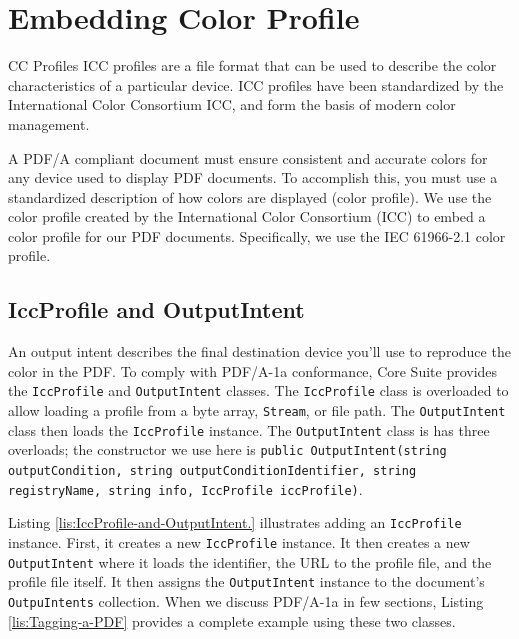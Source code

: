 \documentclass[american]{tufte-book}
\numberwithin{equation}{section}
\numberwithin{figure}{section}
\begin{document}
{{\section{Embedding Color Profile}

CC Profiles ICC profiles are a file format that can be used to describe
the color characteristics of a particular device. ICC profiles have
been standardized by the International Color Consortium ICC, and form
the basis of modern color management.

A PDF/A compliant document must ensure consistent and accurate colors
for any device used to display PDF documents. To accomplish this,
you must use a standardized description of how colors are displayed
(color profile). We use the color profile created by the International
Color Consortium (ICC) to embed a color profile for our PDF documents.
Specifically, we use the IEC 61966-2.1 color profile.

\subsection{IccProfile and OutputIntent}

An output intent describes the final destination device you'll use
to reproduce the color in the PDF. To comply with PDF/A-1a conformance,
Core Suite provides the \texttt{IccProfile} and \texttt{OutputIntent}
classes. The \texttt{IccProfile} class is overloaded to allow loading
a profile from a byte array, \texttt{Stream}, or file path. The \texttt{OutputIntent}
class then loads the \texttt{IccProfile} instance. The \texttt{OutputIntent}
class is has three overloads; the constructor we use here is \texttt{public
OutputIntent(string outputCondition, string outputConditionIdentifier,
string registryName, string info, IccProfile iccProfile)}. 

Listing \ref{lis:IccProfile-and-OutputIntent.} illustrates adding
an \texttt{IccProfile} instance. First, it creates a new \texttt{IccProfile}
instance. It then creates a new \texttt{OutputIntent} where it loads
the identifier, the URL to the profile file, and the profile file
itself. It then assigns the \texttt{OutputIntent} instance to the
document's \texttt{OutpuIntents} collection. When we discuss PDF/A-1a
in few sections, Listing \ref{lis:Tagging-a-PDF} provides a complete
example using these two classes.

}}
\end{document}
